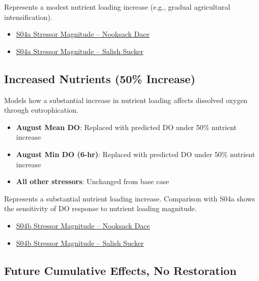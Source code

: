 \documentclass[
  letterpaper,
  DIV=11,
  numbers=noendperiod]{scrreprt}
\providecommand{\tightlist}{%
  \setlength{\itemsep}{0pt}\setlength{\parskip}{0pt}}
\begin{document}
Represents a modest nutrient loading increase (e.g., gradual
agricultural intensification).

\begin{itemize}
\tightlist
\item
  \href{./sample_data/ndss_nooksack_dace/S04a_Increase\%20Nutirents\%2010pct.xlsx}{S04a
  Stressor Magnitude -- Nooksack Dace}
\item
  \href{./sample_data/ndss_salish_sucker/S04a_Increase\%20Nutirents\%2010pct.xlsx}{S04a
  Stressor Magnitude -- Salish Sucker}
\end{itemize}

\subsection*{Increased Nutrients (50\%
Increase)}\label{increased-nutrients-50-increase}

Models how a substantial increase in nutrient loading affects dissolved
oxygen through eutrophication.

\begin{itemize}
\tightlist
\item
  \textbf{August Mean DO}: Replaced with predicted DO under 50\%
  nutrient increase
\item
  \textbf{August Min DO (6-hr)}: Replaced with predicted DO under 50\%
  nutrient increase
\item
  \textbf{All other stressors}: Unchanged from base case
\end{itemize}

Represents a substantial nutrient loading increase. Comparison with S04a
shows the sensitivity of DO response to nutrient loading magnitude.

\begin{itemize}
\tightlist
\item
  \href{./sample_data/ndss_nooksack_dace/S04b_Increase\%20Nutrients\%2050pct.xlsx}{S04b
  Stressor Magnitude -- Nooksack Dace}
\item
  \href{./sample_data/ndss_salish_sucker/S04b_Increase\%20Nutrients\%2050pct.xlsx}{S04b
  Stressor Magnitude -- Salish Sucker}
\end{itemize}

\subsection*{Future Cumulative Effects, No
Restoration}\label{future-cumulative-effects-no-restoration}
\end{document}
